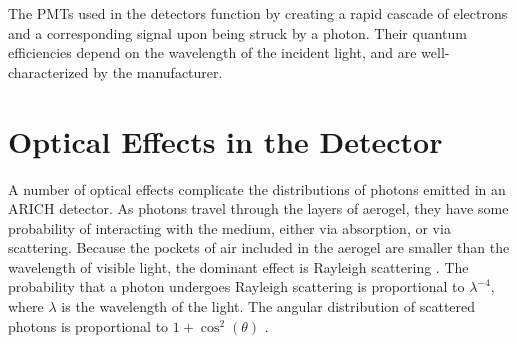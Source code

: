 The \ac{PMT}s used in the detectors function by creating a rapid cascade of electrons and a corresponding signal upon being struck by a photon.
Their quantum efficiencies depend on the wavelength of the incident light, and are well-characterized by the manufacturer.

\section{Optical Effects in the Detector}
\label{sec:optics}
A number of optical effects complicate the distributions of photons emitted in an ARICH detector.
As photons travel through the layers of aerogel, they have some probability of interacting with the medium, either via absorption, or via scattering.
Because the pockets of air included in the aerogel are smaller than the wavelength of visible light, the dominant effect is Rayleigh scattering \cite{aerogelRefraction}. 
The probability that a photon  undergoes Rayleigh scattering is proportional to $\lambda^{-4}$, where $\lambda$ is the wavelength of the light.
The angular distribution of scattered photons is proportional to $1 + \cos^2(\theta)$ \cite{rayleigh}.

\endinput

Any text after an \endinput is ignored.
You could put scraps here or things in progress.
